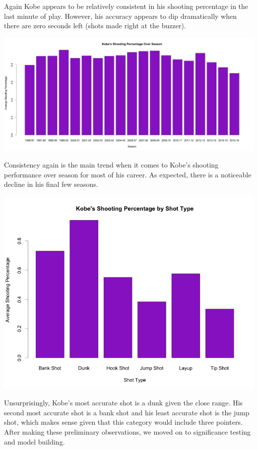 \documentclass[paper=a4, fontsize=11pt]{scrartcl} %
\numberwithin{equation}{section} %
\numberwithin{figure}{section} %
\numberwithin{table}{section} %
\begin{document}
Again Kobe appears to be relatively consistent in his shooting percentage in the last minute of play. However, his accuracy appears to dip dramatically when there are zero seconds left (shots made right at the buzzer).
\begin{center}
	\includegraphics[width=19cm]{img/season}
\end{center}
Consistency again is the main trend when it comes to Kobe's shooting performance over season for most of his career. As expected, there is a noticeable decline in his final few seasons.
\begin{center}
	\includegraphics[width=14cm]{img/type}
\end{center}
Unsurprisingly, Kobe's most accurate shot is a dunk given the close range. His second most accurate shot is a bank shot and his least accurate shot is the jump shot, which makes sense given that this category would include three pointers.\\

After making these preliminary observations, we moved on to significance testing and model building.
\end{document}
